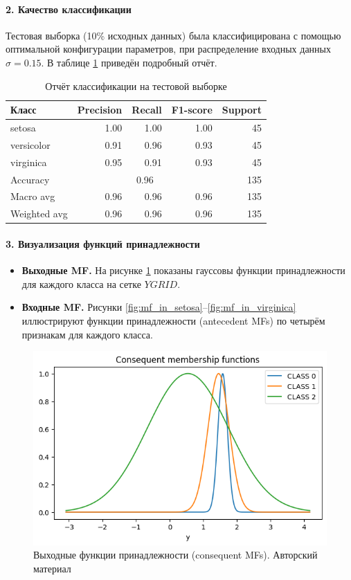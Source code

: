 \paragraph{2. Качество классификации}  
Тестовая выборка (10\% исходных данных) была классифицирована с помощью оптимальной конфигурации параметров, при распределение входных данных $\sigma=0.15$. В таблице \ref{tab:class_report} приведён подробный отчёт.

\begin{table}[H]
  \centering
  \begin{tabular}{lrrrr}
    \toprule
    Класс & Precision & Recall & F1-score & Support \\
    \midrule
    setosa     & 1.00 & 1.00 & 1.00 & 45 \\
    versicolor & 0.91 & 0.96 & 0.93 & 45 \\
    virginica  & 0.95 & 0.91 & 0.93 & 45 \\
    \midrule
    Accuracy   & \multicolumn{3}{c}{0.96} & 135 \\
    Macro avg  & 0.96 & 0.96 & 0.96 & 135 \\
    Weighted avg & 0.96 & 0.96 & 0.96 & 135 \\
    \bottomrule
  \end{tabular}
  \caption{Отчёт классификации на тестовой выборке}
  \label{tab:class_report}
\end{table}

\paragraph{3. Визуализация функций принадлежности}  
\begin{itemize}
  \item \textbf{Выходные MF.} На рисунке \ref{fig:mf_out} показаны гауссовы функции принадлежности для каждого класса на сетке $YGRID$.
  \item \textbf{Входные MF.} Рисунки \ref{fig:mf_in_setosa}–\ref{fig:mf_in_virginica} иллюстрируют функции принадлежности (antecedent MFs) по четырём признакам для каждого класса.
\end{itemize}

\begin{figure}[H]
  \centering
  \includegraphics[width=0.7\linewidth]{images/mf_out.png}
  \caption{Выходные функции принадлежности (consequent MFs). Авторский материал}
  \label{fig:mf_out}
\end{figure}

